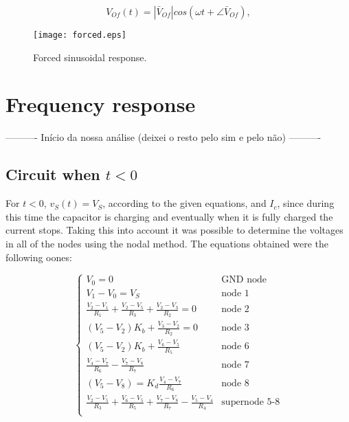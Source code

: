 \begin{equation}
  V_{Of}(t) = |\bar{V}_{Of}| cos(\omega t + \angle \bar{V}_{Of}),
  \label{eq:vo_for}
\end{equation}

\lipsum[1-1]


\begin{figure}[h] \centering
\texttt{[image: forced.eps]}
\caption{Forced sinusoidal response.}
\label{fig:forced}
\end{figure}


\section{Frequency response}








---------- Início da nossa análise (deixei o resto pelo sim e pelo não) ----------




\subsection{Circuit when $t<0$}
For $t<0$, $v_S(t) = V_S$, according to the given equations, and $I_c$, since during this time the capacitor is charging and eventually when it is fully charged the current stops. Taking this into account it was possible to determine the voltages in all of the nodes using the nodal method. The equations obtained were the following oones:






\begin{equation}
  \begin{cases}
  V_0 = 0 & \mbox{GND node} \\
  V_1-V_0 = V_S & \mbox{node 1} \\
  \frac{V_2-V_1}{R_1}+\frac{V_2-V_5}{R_3}+\frac{V_2-V_3}{R_2} = 0 & \mbox{node 2} \\
  (V_5-V_2)K_b + \frac{V_3-V_2}{R_2} = 0 & \mbox{node 3} \\
  (V_5-V_2)K_b + \frac{V_6-V_5}{R_5} & \mbox{node 6} \\
  \frac{V_4-V_7}{R_6} - \frac{V_7-V_8}{R_7} & \mbox{node 7} \\
  (V_5-V_8) = K_d \frac{V_4-V_7}{R_6} & \mbox{node 8} \\
  \frac{V_2-V_5}{R_3} + \frac{V_6-V_5}{R_5} + \frac{V_7-V_8}{R_7} - \frac{V_5-V_4}{R_4} & \mbox{supernode 5-8} \\ 
  \end{cases}
\end{equation}

